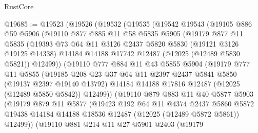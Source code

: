 \begin{lexlean}{RustCore}
\begin{coremodule}
@19685 := @19523
    (@19526
      (@19532
        (@19535
          (@19542
            @19543
            (@19105
              @886
              @59
              @5906
              (@19110
                @877
                @885
                @11
                @58
                @5835
                @5905
                (@19179
                  @877
                  @11
                  @5835
                  (@19393
                    @73
                    @64
                    @11
                    @3126
                    @2437
                    @5820
                    @5830
                    (@19121 @3126 @19125 @14338)
                    @14184
                    @14188
                    @17742
                    @12487
                    (@12025 (@12489 @5830 @5821))
                    @12499))
                (@19110
                  @777
                  @884
                  @11
                  @43
                  @5855
                  @5904
                  (@19179
                    @777
                    @11
                    @5855
                    (@19185
                      @208
                      @23
                      @37
                      @64
                      @11
                      @2397
                      @2437
                      @5841
                      @5850
                      (@19137 @2397 @19140 @13792)
                      @14184
                      @14188
                      @17816
                      @12487
                      (@12025 (@12489 @5850 @5842))
                      @12499))
                  (@19110
                    @879
                    @883
                    @11
                    @40
                    @5877
                    @5903
                    (@19179
                      @879
                      @11
                      @5877
                      (@19423
                        @192
                        @64
                        @11
                        @4374
                        @2437
                        @5860
                        @5872
                        @19438
                        @14184
                        @14188
                        @18536
                        @12487
                        (@12025 (@12489 @5872 @5861))
                        @12499))
                    (@19110
                      @881
                      @214
                      @11
                      @27
                      @5901
                      @2403
                      (@19179

\end{coremodule}
\end{lexlean}
